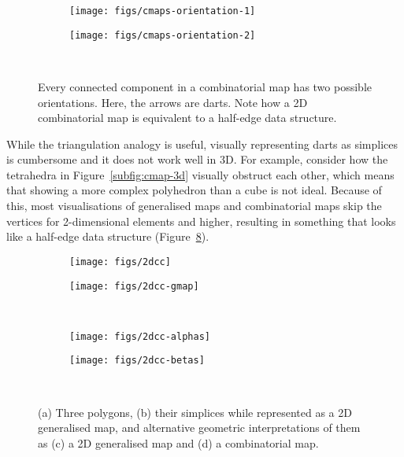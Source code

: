 \begin{figure}
\centering
\begin{subfigure}{0.33\linewidth}
\texttt{[image: figs/cmaps-orientation-1]}
\caption{}%
\label{subfig:cmaps-orientation-1}
\end{subfigure}%
\quad
\begin{subfigure}{0.33\linewidth}
\texttt{[image: figs/cmaps-orientation-2]}
\caption{}%
\label{subfig:cmaps-orientation-2}
\end{subfigure}\\
\caption{Every connected component in a combinatorial map has two possible orientations.
Here, the arrows are darts.
Note how a 2D combinatorial map is equivalent to a half-edge data structure.}%
\label{fig:cmaps-orientation}
\end{figure}

While the triangulation analogy is useful, visually representing darts as simplices is cumbersome and it does not work well in 3D.
For example, consider how the tetrahedra in Figure~\ref{subfig:cmap-3d} visually obstruct each other, which means that showing a more complex polyhedron than a cube is not ideal.
Because of this, most visualisations of generalised maps and combinatorial maps skip the vertices for 2-dimensional elements and higher, resulting in something that looks like a half-edge data structure (Figure~\ref{fig:2dcc}).

\begin{figure}
\centering
\begin{subfigure}{0.33\linewidth}
\texttt{[image: figs/2dcc]}
\caption{}%
\label{subfig:2dcc}
\end{subfigure}%
\quad
\begin{subfigure}{0.33\linewidth}
\texttt{[image: figs/2dcc-gmap]}
\caption{}%
\label{subfig:2dcc-gmap}
\end{subfigure}\\
\begin{subfigure}{0.33\linewidth}
\texttt{[image: figs/2dcc-alphas]}
\caption{}%
\label{subfig:2dcc-alphas}
\end{subfigure}%
\quad
\quad
\begin{subfigure}{0.33\linewidth}
\texttt{[image: figs/2dcc-betas]}
\caption{}%
\label{subfig:2dcc-betas}
\end{subfigure}\\
\caption{(a) Three polygons, (b) their simplices while represented as a 2D generalised map, and alternative geometric interpretations of them as (c) a 2D generalised map and (d) a combinatorial map.}%
\label{fig:2dcc}
\end{figure}

